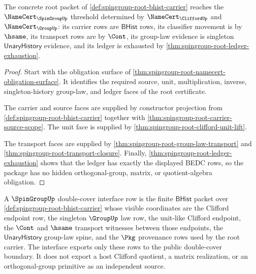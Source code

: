 \begin{theorem}
\label{thm:spingroup-root-namecert-threshold-package}
The concrete root packet of \autoref{def:spingroup-root-bhist-carrier} reaches the $\NameCert_{\SpinGroupUp}$ threshold determined by $\NameCert_{\CliffordUp}$ and $\NameCert_{\GroupUp}$: its carrier rows are $\mathsf{BHist}$ rows, its classifier movement is by $\hsame$, its transport rows are by $\Cont$, its group-law evidence is singleton $\mathsf{UnaryHistory}$ evidence, and its ledger is exhausted by \autoref{thm:spingroup-root-ledger-exhaustion}.
\end{theorem}
\begin{proof}
Start with the obligation surface of \autoref{thm:spingroup-root-namecert-obligation-surface}. It identifies the required source, unit, multiplication, inverse, singleton-history group-law, and ledger faces of the root certificate.

The carrier and source faces are supplied by constructor projection from \autoref{def:spingroup-root-bhist-carrier} together with \autoref{thm:spingroup-root-carrier-source-scope}. The unit face is supplied by \autoref{thm:spingroup-root-clifford-unit-lift}.

The transport faces are supplied by \autoref{thm:spingroup-root-group-law-transport} and \autoref{thm:spingroup-root-transport-closure}. Finally, \autoref{thm:spingroup-root-ledger-exhaustion} shows that the ledger has exactly the displayed BEDC rows, so the package has no hidden orthogonal-group, matrix, or quotient-algebra obligation.
\end{proof}



\begin{definition}
\label{def:spingroup-double-cover-interface-row}
A $\SpinGroupUp$ double-cover interface row is the finite $\mathsf{BHist}$ packet over \autoref{def:spingroup-root-bhist-carrier} whose visible coordinates are the Clifford endpoint row, the singleton $\GroupUp$ law row, the unit-like Clifford endpoint, the $\Cont$ and $\hsame$ transport witnesses between those endpoints, the $\mathsf{UnaryHistory}$ group-law spine, and the $\Pkg$ provenance rows used by the root carrier. The interface exports only these rows to the public double-cover boundary. It does not export a host Clifford quotient, a matrix realization, or an orthogonal-group primitive as an independent source.
\end{definition}


